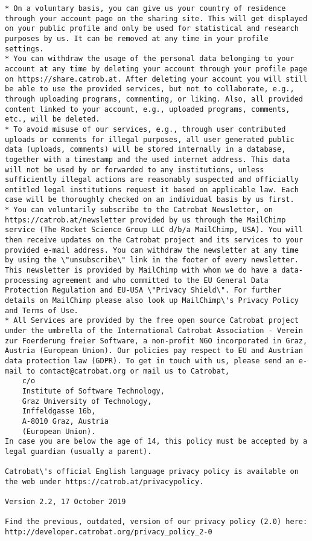 \begin{multicols}{3}
\begin{lstlisting}[caption={Privacy Policy for Pocket Code},captionpos=b,label={pocketcode-privacypolicy}]
* On a voluntary basis, you can give us your country of residence through your account page on the sharing site. This will get displayed on your public profile and only be used for statistical and research purposes by us. It can be removed at any time in your profile settings.
* You can withdraw the usage of the personal data belonging to your account at any time by deleting your account through your profile page on https://share.catrob.at. After deleting your account you will still be able to use the provided services, but not to collaborate, e.g., through uploading programs, commenting, or liking. Also, all provided content linked to your account, e.g., uploaded programs, comments, etc., will be deleted.
* To avoid misuse of our services, e.g., through user contributed uploads or comments for illegal purposes, all user generated public data (uploads, comments) will be stored internally in a database, together with a timestamp and the used internet address. This data will not be used by or forwarded to any institutions, unless sufficiently illegal actions are reasonably suspected and officially entitled legal institutions request it based on applicable law. Each case will be thoroughly checked on an individual basis by us first.
* You can voluntarily subscribe to the Catrobat Newsletter, on https://catrob.at/newsletter provided by us through the MailChimp service (The Rocket Science Group LLC d/b/a MailChimp, USA). You will then receive updates on the Catrobat project and its services to your provided e-mail address. You can withdraw the newsletter at any time by using the \"unsubscribe\" link in the footer of every newsletter. This newsletter is provided by MailChimp with whom we do have a data-processing agreement and who committed to the EU General Data Protection Regulation and EU-USA \"Privacy Shield\". For further details on MailChimp please also look up MailChimp\'s Privacy Policy and Terms of Use.
* All Services are provided by the free open source Catrobat project under the umbrella of the International Catrobat Association - Verein zur Foerderung freier Software, a non-profit NGO incorporated in Graz, Austria (European Union). Our policies pay respect to EU and Austrian data protection law (GDPR). To get in touch with us, please send an e-mail to contact@catrobat.org or mail us to Catrobat,
    c/o
    Institute of Software Technology,
    Graz University of Technology,
    Inffeldgasse 16b,
    A-8010 Graz, Austria
    (European Union).
In case you are below the age of 14, this policy must be accepted by a legal guardian (usually a parent).

Catrobat\'s official English language privacy policy is available on the web under https://catrob.at/privacypolicy.

Version 2.2, 17 October 2019

Find the previous, outdated, version of our privacy policy (2.0) here: http://developer.catrobat.org/privacy_policy_2-0
\end{lstlisting}
\end{multicols}
